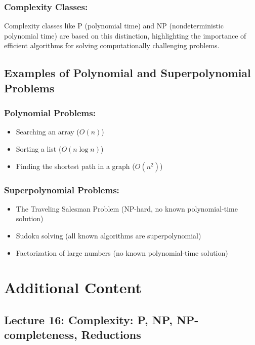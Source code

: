 \documentclass[letter, 12pt]{article}
\begin{document}
    \subsubsection{Complexity Classes:}
    Complexity classes like P (polynomial time) and NP (nondeterministic polynomial time) are based on this distinction, highlighting the importance of efficient algorithms for solving computationally challenging problems.

    \subsection{Examples of Polynomial and Superpolynomial Problems}

    \subsubsection{Polynomial Problems:}
    \begin{itemize}
        \item Searching an array ($O(n)$)
        \item Sorting a list ($O(n \log n)$)
        \item Finding the shortest path in a graph ($O(n^2)$)
    \end{itemize}

    \subsubsection{Superpolynomial Problems:}
    \begin{itemize}
        \item The Traveling Salesman Problem (NP-hard, no known polynomial-time solution)
        \item Sudoku solving (all known algorithms are superpolynomial)
        \item Factorization of large numbers (no known polynomial-time solution)
    \end{itemize}

    \section{Additional Content}

    \subsection{Lecture 16: Complexity: P, NP, NP-completeness, Reductions \cite{demaine2015complexity}}
\end{document}
